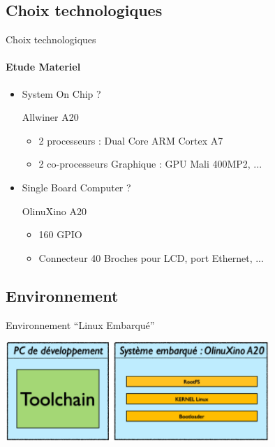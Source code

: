 \documentclass[11pt]{beamer}
\begin{document}
	\subsection{Choix technologiques}
	\begin{frame}[label=choix]{Choix technologiques}
	\framesubtitle{Etude Materiel}
	\begin{itemize}
	\item System On Chip ?
	\begin{block}{Allwiner A20  \hyperlink{SoC}{}\\}
	\begin{itemize} 
	
	  \item 2 processeurs : Dual Core ARM Cortex A7
	  \item 2 co-processeurs Graphique : GPU Mali 400MP2, ...
	\end{itemize}
	\end{block}
	
	\item Single Board Computer ?
	\begin{block}{OlinuXino A20 \hyperlink{SbC_2}{}}
	\begin{itemize}  
	  \item 160 GPIO
	  \item Connecteur 40 Broches pour LCD, port Ethernet, ...\\
	\end{itemize}
	\end{block}
	\end{itemize}
	\end{frame}
	
	
	\subsection{Environnement}
	\begin{frame}{Environnement ``Linux Embarqué''}
	\begin{center}
	\includegraphics[width=10cm]{common/arcg.png}	
	\end{center}
	\end{frame}
	
\end{document}
